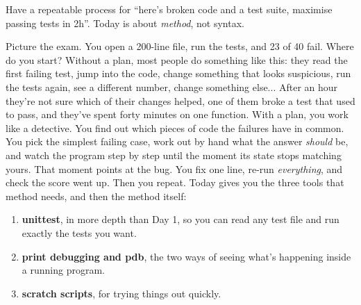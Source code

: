\documentclass[10pt,a4paper]{article}
\begin{document}
\makecover
\setcounter{page}{2}
\makefrontmatter
\begin{goalbox}
Have a repeatable process for “here’s broken code and a test suite, maximise passing tests in 2h”. Today is about \emph{method}, not syntax.
\end{goalbox}
\vspace{2pt}
Picture the exam. You open a 200-line file, run the tests, and 23 of 40 fail. Where do you start?
Without a plan, most people do something like this: they read the first failing test, jump into the code, change something that looks suspicious, run the tests again, see a different number, change something else... After an hour they’re not sure which of their changes helped, one of them broke a test that used to pass, and they’ve spent forty minutes on one function.
With a plan, you work like a detective. You find out which pieces of code the failures have in common. You pick the simplest failing case, work out by hand what the answer \emph{should} be, and watch the program step by step until the moment its state stops matching yours. That moment points at the bug. You fix one line, re-run \emph{everything}, and check the score went up. Then you repeat.
Today gives you the three tools that method needs, and then the method itself:
\begin{enumerate}
\item \textbf{unittest}, in more depth than Day 1, so you can read any test file and run exactly the tests you want.
\item \textbf{print debugging and pdb}, the two ways of seeing what’s happening inside a running program.
\item \textbf{scratch scripts}, for trying things out quickly.
\end{enumerate}
\setcounter{section}{0}
\end{document}
